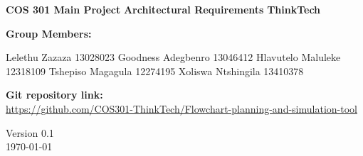 \begin{titlepage}
	\begin{center}
		
		\begin{figure}[t]
			\centering
		\end{figure}		
	
	
	\begin{flushright} 
		
		\textbf{\LARGE COS 301 Main Project}
		\newline \newline \newline
		\textbf{\LARGE Architectural Requirements}
		\newline \newline \newline
 		\textbf{\LARGE ThinkTech}
		\newline \newline \newline
	\end{flushright}
		
		\vspace{1 cm}
		
		\LARGE{\textbf{Group Members: }}
		

		\begin{flushright} \large
			Lelethu Zazaza 13028023\newline
			Goodness Adegbenro 13046412\newline
			Hlavutelo Maluleke 12318109\newline
			Tshepiso Magagula 12274195\newline
			Xoliswa Ntshingila 13410378\newline
		\end{flushright}
		
	
		
		\textbf{Git repository link:\\}
		 \url{ https://github.com/COS301-ThinkTech/Flowchart-planning-and-simulation-tool}
		
		\vfill
		
		{\LARGE Version 0.1}
		\\
		{\large \today}		
		
		
	\end{center}
\end{titlepage}
